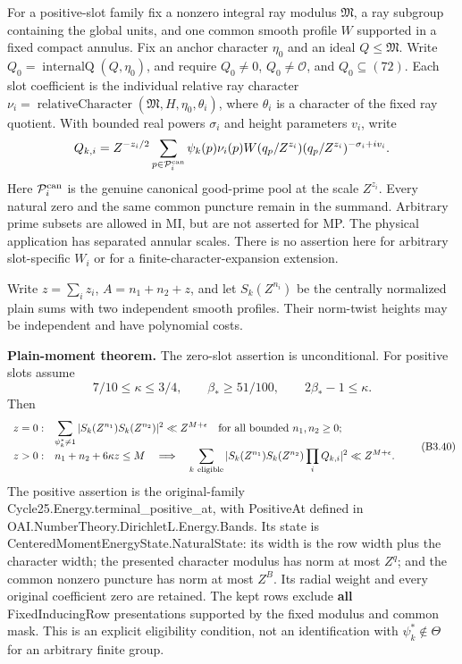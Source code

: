 \documentclass[11pt,a4paper]{article}
\newcommand{\sourcecode}[1]{{\small\ttfamily #1}}
\begin{document}
For a positive-slot family fix a nonzero integral ray modulus
\(\mathfrak M\), a ray subgroup containing the global units, and one
common smooth profile \(W\) supported in a fixed compact annulus. Fix an
anchor character \(\eta_0\) and an ideal \(Q\le\mathfrak M\). Write
\(Q_0=\operatorname{internalQ}(Q,\allowbreak{}\eta_0)\), and require \(Q_0\ne0\),
\(Q_0\ne\mathcal O\), and \(Q_0\subseteq(72)\). Each slot coefficient is
the individual relative ray character
\(\nu_i=\operatorname{relativeCharacter}(\mathfrak M,\allowbreak{}H,\allowbreak{}\eta_0,\allowbreak{}\theta_i)\),
where \(\theta_i\) is a character of the fixed ray quotient. With
bounded real powers \(\sigma_i\) and height parameters \(v_i\), write \[
Q_{k,i}=Z^{-z_i/2}\sum_{p\in\mathcal P_i^{\rm can}}
 \psi_k(p)\nu_i(p)W(q_p/Z^{z_i})
 (q_p/Z^{z_i})^{-\sigma_i+iv_i}.
\] Here \(\mathcal P_i^{\rm can}\) is the genuine canonical good-prime
pool at the scale \(Z^{z_i}\). Every natural zero and the same common
puncture remain in the summand. Arbitrary prime subsets are allowed in
MI, but are not asserted for MP. The physical application has separated
annular scales. There is no assertion here for arbitrary slot-specific
\(W_i\) or for a finite-character-expansion extension.

Write \(z=\sum_i z_i\), \(A=n_1+n_2+z\), and let \(S_k(Z^{n_i})\) be the
centrally normalized plain sums with two independent smooth profiles.
Their norm-twist heights may be independent and have polynomial costs.

\textbf{Plain-moment theorem.} The zero-slot assertion is unconditional.
For positive slots assume \[
7/10\le\kappa\le3/4,\qquad \beta_*\ge51/100,\qquad
2\beta_*-1\le\kappa.
\] Then \[
\begin{array}{ll}
z=0:&\displaystyle
 \sum_{\psi_k^*\ne1}|S_k(Z^{n_1})S_k(Z^{n_2})|^2\ll Z^{M+\epsilon}
 \quad\text{for all bounded }n_1,n_2\ge0;\\[2mm]
z>0:&\displaystyle
 n_1+n_2+6\kappa z\le M
 \quad\Longrightarrow\quad
 \sum_{k\ {\rm eligible}}|S_k(Z^{n_1})S_k(Z^{n_2})\prod_iQ_{k,i}|^2
 \ll Z^{M+\epsilon}.
\end{array}\tag{B3.40}
\] The positive assertion is the original-family
\sourcecode{Cycle25.\allowbreak{}Energy.\allowbreak{}terminal\_\allowbreak{}positive\_\allowbreak{}at}, with \sourcecode{Positive\allowbreak{}At}
defined in \sourcecode{OAI.\allowbreak{}Number\allowbreak{}Theory.\allowbreak{}Dirichlet\allowbreak{}L.\allowbreak{}Energy.\allowbreak{}Bands}. Its state
is \sourcecode{Centered\allowbreak{}Moment\allowbreak{}Energy\allowbreak{}State.\allowbreak{}Natural\allowbreak{}State}: its width is the row
width plus the character width; the presented character modulus has norm
at most \(Z^q\); and the common nonzero puncture has norm at most
\(Z^B\). Its radial weight and every original coefficient zero are
retained. The kept rows exclude \textbf{all} \sourcecode{Fixed\allowbreak{}Inducing\allowbreak{}Row}
presentations supported by the fixed modulus and common mask. This is an
explicit eligibility condition, not an identification with
\(\psi_k^*\notin\Theta\) for an arbitrary finite group.
\end{document}
